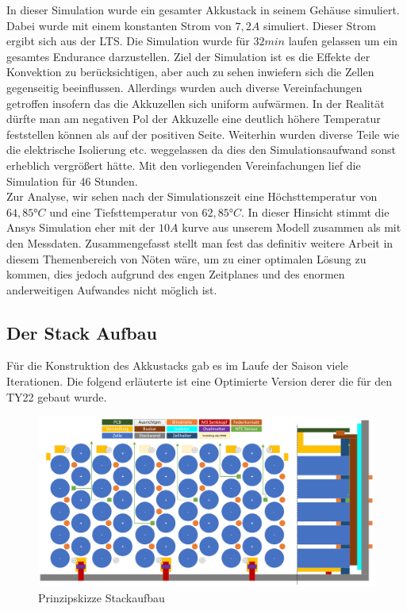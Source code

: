 In dieser Simulation wurde ein gesamter Akkustack in seinem Gehäuse simuliert. Dabei wurde mit einem konstanten Strom von \ensuremath{7,2 A} simuliert. Dieser Strom ergibt sich aus der \ac{LTS}. Die Simulation wurde für \ensuremath{32 min} laufen gelassen um ein gesamtes Endurance darzustellen. Ziel der Simulation ist es die Effekte der Konvektion zu berücksichtigen, aber auch zu sehen inwiefern sich die Zellen gegenseitig beeinflussen. Allerdings wurden auch diverse Vereinfachungen getroffen insofern das die Akkuzellen sich uniform aufwärmen. In der Realität dürfte man am negativen Pol der Akkuzelle eine deutlich höhere Temperatur feststellen können als auf der positiven Seite. Weiterhin wurden diverse Teile wie die elektrische Isolierung etc. weggelassen da dies den Simulationsaufwand sonst erheblich vergrößert hätte. Mit den vorliegenden Vereinfachungen lief die Simulation für 46 Stunden.\\
Zur Analyse, wir sehen nach der Simulationszeit eine Höchsttemperatur von \ensuremath{64,85°C} und eine Tiefsttemperatur von \ensuremath{62,85°C}. In dieser Hinsicht stimmt die Ansys Simulation eher mit der \ensuremath{10 A} kurve aus unserem Modell zusammen als mit den Messdaten. Zusammengefasst stellt man fest das definitiv weitere Arbeit in diesem Themenbereich von Nöten wäre, um zu einer optimalen Lösung zu kommen, dies jedoch aufgrund des engen Zeitplanes und des enormen anderweitigen Aufwandes nicht möglich ist.

\FloatBarrier
\subsection{Der Stack Aufbau} %

Für die Konstruktion des Akkustacks gab es im Laufe der Saison viele Iterationen. Die folgend erläuterte ist eine Optimierte Version derer die für den TY22 gebaut wurde.

\begin{figure}
	\centering
	\includegraphics[width=0.7\linewidth]{bilder/Stackaufbau_Prinzipskizze}
	\caption{Prinzipskizze Stackaufbau}
	\label{fig:stackaufbauprinzipskizze}
\end{figure}

